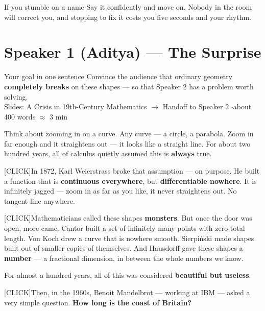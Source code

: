 \documentclass[12pt,a4paper]{article}
\newcommand{\cue}{\textcolor{RayColor}{\textsf{\footnotesize[CLICK]}}\hspace{0.3em}}
\newcommand{\stress}[1]{\textbf{#1}}
\begin{document}
\begin{notebox}{If you stumble on a name}
  Say it confidently and move on. Nobody in the room will correct you, and
  stopping to fix it costs you five seconds and your rhythm.
\end{notebox}

\newpage
\section*{Speaker 1 (Aditya) --- The Surprise}

\begin{speakerbox}{Your goal in one sentence}
  Convince the audience that ordinary geometry \stress{completely breaks} on
  these shapes --- so that Speaker 2 has a problem worth solving.\\[4pt]
  {\small\color{DarkGray} Slides: A Crisis in 19th-Century Mathematics $\rightarrow$
  Handoff to Speaker 2 \quad$\cdot$\quad about 400 words $\approx$ 3 min}
\end{speakerbox}

\vspace{0.3cm}

Think about zooming in on a curve. Any curve --- a circle, a parabola. Zoom in
far enough and it straightens out --- it looks like a straight line. For about two
hundred years, all of calculus quietly assumed this is \stress{always} true.

\cue In 1872, Karl Weierstrass broke that assumption --- on purpose. He built a
function that is \stress{continuous everywhere}, but \stress{differentiable
nowhere}. It is infinitely jagged --- zoom in as far as you like, it never
straightens out. No tangent line anywhere.

\cue Mathematicians called these shapes \stress{monsters}. But once the door was
open, more came. Cantor built a set of infinitely many points with zero total
length. Von Koch drew a curve that is nowhere smooth. Sierpi\'nski made shapes
built out of smaller copies of themselves. And Hausdorff gave these shapes a
\stress{number} --- a fractional dimension, in between the whole numbers we know.

For almost a hundred years, all of this was considered \stress{beautiful but
useless}.

\cue Then, in the 1960s, Benoit Mandelbrot --- working at IBM --- asked a very
simple question. \stress{How long is the coast of Britain?}
\end{document}
